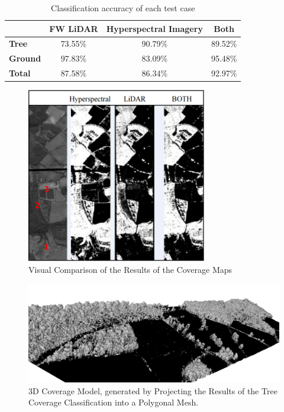 \documentclass{subfiles}
\begin{document}
\begin{table}[!h]
	\centering
\begin{tabular}{| l || c | c | c| }
	\hline		
	& \textbf{FW LiDAR} & \textbf{Hyperspectral Imagery} & \textbf{Both} \\	
	\hline			
	\hline			
	\textbf{Tree} & 73.55\% & 90.79\% & 89.52\% \\
	\hline			
	\textbf{Ground} & 97.83\% & 83.09\% & 95.48\% \\
	\hline			
	\textbf{Total} & 87.58\% & 86.34\% &92.97\% \\
	\hline  
\end{tabular}
	\caption{ Classification accuracy of each test case}
	\label{tab:CoverageResults}
\end{table}



\newpage
\begin{figure} [h!]
	\centering
	\includegraphics[width=0.7\textwidth]{img/CoverageResults}
	\caption{Visual Comparison of the Results of the Coverage Maps }
	\label{fig:CoverageResults}
\end{figure}

\begin{figure} [h!]
	\centering
	\includegraphics[width=\textwidth]{img/CoverageProjected}
	\caption[3D Coverage Model]{3D Coverage Model, generated by Projecting the Results of the Tree Coverage Classification into a Polygonal Mesh.}
	\label{fig:CoverageProjectedPolygon}
\end{figure}
\end{document}
